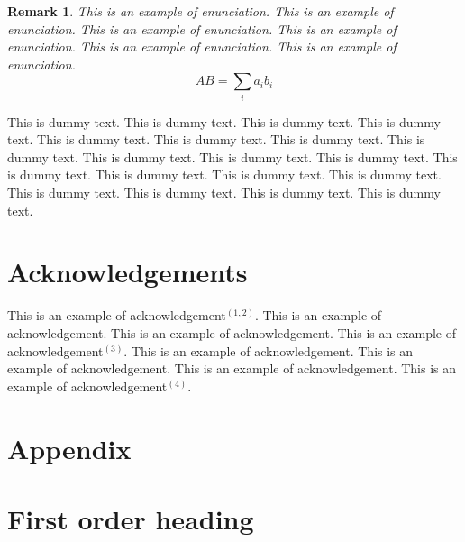 \documentclass{jpp}
\newtheorem{remark}{Remark}
\begin{document}
\begin{remark}
This is an example of enunciation. This is an example of enunciation. This is an
example of enunciation. This is an example of enunciation. This is an example of enunciation.
This is an example of enunciation.
\begin{equation*}
AB = \sum_{i} a_{i} b_{i}
\end{equation*}
\end{remark}

This is dummy text. This is dummy text. This is dummy text. This is dummy text. This is
dummy text. This is dummy text. This is dummy text. This is dummy text. This is dummy
text. This is dummy text. This is dummy text. This is dummy text. This is dummy text. This
is dummy text. This is dummy text. This is dummy text. This is dummy text. This is dummy
text. This is dummy text.

\section*{Acknowledgements}

This is an example of acknowledgement$^{(1,2)}$. This is an example of acknowledgement. This
is an example of acknowledgement. This is an example of acknowledgement$^{(3)}$. This is an
example of acknowledgement. This is an example of acknowledgement. This is an example
of acknowledgement. This is an example of acknowledgement$^{(4)}$.\cite{RN2131}


\makeatletter
\def\fps@table{h}
\def\fps@figure{h}
\makeatother


\section*{Appendix}

\section*{First order heading}
\end{document}
